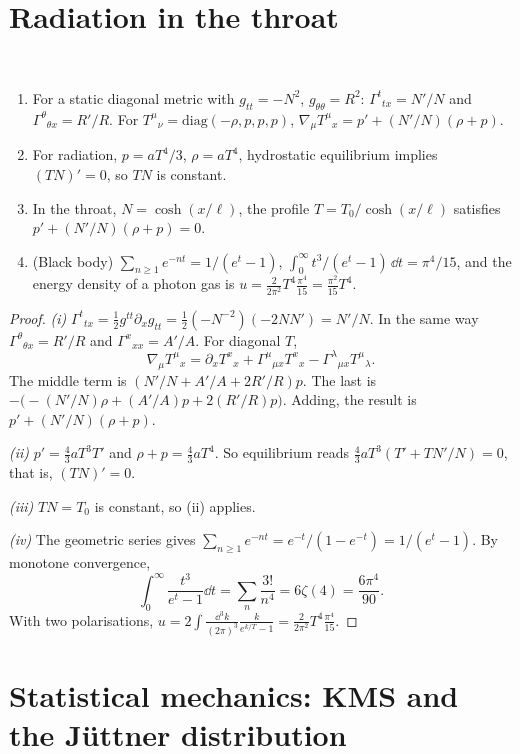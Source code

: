 \section{Radiation in the throat}

\begin{theorem}\label{thm:tolmanlaw}\ver\
\begin{enumerate}[label=(\roman*)]
\item For a static diagonal metric with $g_{tt}=-N^2$, $g_{\theta\theta}=R^2$: $\Gamma^t{}_{tx}=N'/N$ and $\Gamma^\theta{}_{\theta x}=R'/R$. For $T^\mu{}_\nu=\mathrm{diag}(-\rho,p,p,p)$, $\nabla_\mu T^\mu{}_x=p'+(N'/N)(\rho+p)$.
\item For radiation, $p=aT^4/3$, $\rho=aT^4$, hydrostatic equilibrium implies $(TN)'=0$, so $TN$ is constant.
\item In the throat, $N=\cosh(x/\ell)$, the profile $T=T_0/\cosh(x/\ell)$ satisfies $p'+(N'/N)(\rho+p)=0$.
\item (Black body) $\sum_{n\ge1}e^{-nt}=1/(e^t-1)$, $\int_0^\infty t^3/(e^t-1)\,\dd t=\pi^4/15$, and the energy density of a photon gas is $u=\frac{2}{2\pi^2}T^4\frac{\pi^4}{15}=\frac{\pi^2}{15}T^4$.
\end{enumerate}
\end{theorem}
\begin{proof}
\emph{(i)} $\Gamma^t{}_{tx}=\frac12g^{tt}\partial_xg_{tt}=\frac12(-N^{-2})(-2NN')=N'/N$. In the same way $\Gamma^\theta{}_{\theta x}=R'/R$ and $\Gamma^x{}_{xx}=A'/A$. For diagonal $T$,
\[
\nabla_\mu T^\mu{}_x=\partial_xT^x{}_x+\Gamma^\mu{}_{\mu x}T^x{}_x-\Gamma^\lambda{}_{\mu x}T^\mu{}_\lambda .
\]
The middle term is $(N'/N+A'/A+2R'/R)p$. The last is $-\bigl(-(N'/N)\rho+(A'/A)p+2(R'/R)p\bigr)$. Adding, the result is $p'+(N'/N)(\rho+p)$.

\emph{(ii)} $p'=\frac43aT^3T'$ and $\rho+p=\frac43aT^4$. So equilibrium reads $\frac43aT^3(T'+TN'/N)=0$, that is, $(TN)'=0$.

\emph{(iii)} $TN=T_0$ is constant, so (ii) applies.

\emph{(iv)} The geometric series gives $\sum_{n\ge1}e^{-nt}=e^{-t}/(1-e^{-t})=1/(e^t-1)$. By monotone convergence,
\[
\int_0^\infty\frac{t^3}{e^t-1}\dd t=\sum_n\frac{3!}{n^4}=6\zeta(4)=\frac{6\pi^4}{90}.
\]
With two polarisations, $u=2\int\frac{\dd^3k}{(2\pi)^3}\frac k{e^{k/T}-1}=\frac{2}{2\pi^2}T^4\frac{\pi^4}{15}$.
\end{proof}


\section{Statistical mechanics: KMS and the J\"uttner distribution}

